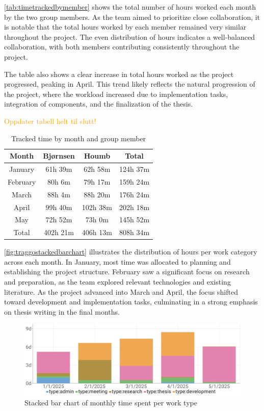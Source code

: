 \autoref{tab:timetrackedbymember} shows the total number of hours worked each month by the two group members. As the team aimed to prioritize close collaboration, it is notable that the total hours worked by each member remained very similar throughout the project. The even distribution of hours indicates a well-balanced collaboration, with both members contributing consistently throughout the project.

The table also shows a clear increase in total hours worked as the project progressed, peaking in April. This trend likely reflects the natural progression of the project, where the workload increased due to implementation tasks, integration of components, and the finalization of the thesis.

\textcolor{orange}{Oppdater tabell helt til slutt!}
\begin{table}[h]
    \centering
    \begin{tabular}{c|c|c|c}
        \hline
        \textbf{Month} & \textbf{Bjørnsen} & \textbf{Houmb} & \textbf{Total} \\
        \hline
        January  & 61h 39m  & 62h 58m   & 124h 37m  \\
        February & 80h 6m   & 79h 17m   & 159h 24m  \\
        March    & 88h 4m   & 88h 20m   & 176h 24m  \\
        April    & 99h 40m  & 102h 38m  & 202h 18m  \\
        May      & 72h 52m  & 73h 0m    & 145h 52m  \\
        \hline
        Total    & 402h 21m & 406h 13m  & 808h 34m  \\
        \hline
    \end{tabular}
    \caption{Tracked time by month and group member}
    \label{tab:timetrackedbymember}
\end{table}

\autoref{fig:traggostackedbarchart} illustrates the distribution of hours per work category across each month. In January, most time was allocated to planning and establishing the project structure. February saw a significant focus on research and preparation, as the team explored relevant technologies and existing literature. As the project advanced into March and April, the focus shifted toward development and implementation tasks, culminating in a strong emphasis on thesis writing in the final months.

\begin{figure}[h]
    \centering
    \includegraphics[width=1.1\linewidth]{figures/traggo_stackedbarchart.jpg}
    \caption{Stacked bar chart of monthly time spent per work type}
    \label{fig:traggostackedbarchart}
\end{figure}

